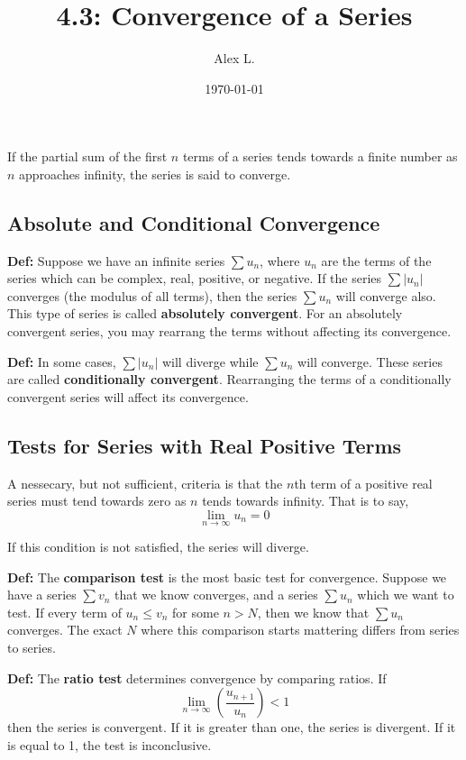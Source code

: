 \documentclass{article}
\title{4.3: Convergence of a Series}
\author{Alex L.}
\date{\today}
\begin{document}
\maketitle

If the partial sum of the first $n$ terms of a series tends towards a finite number as $n$ approaches infinity, the series is said to converge.

\subsection{Absolute and Conditional Convergence}

\textbf{Def:} Suppose we have an infinite series $\sum u_n$, where $u_n$ are the terms of the series which can be complex, real, positive, or negative. If the series $\sum \vert u_n \vert$ converges (the modulus of all terms), then the series $\sum u_n$ will converge also. This type of series is called \textbf{absolutely convergent}. For an absolutely convergent series, you may rearrang the terms without affecting its convergence. 

\textbf{Def:} In some cases, $\sum \vert u_n \vert$ will diverge while $\sum u_n$ will converge. These series are called \textbf{conditionally convergent}. Rearranging the terms of a conditionally convergent series will affect its convergence.

\subsection{Tests for Series with Real Positive Terms}

A nessecary, but not sufficient, criteria is that the $n$th term of a positive real series must tend towards zero as $n$ tends towards infinity. That is to say, $$\lim_{n \to \infty} u_n = 0$$

If this condition is not satisfied, the series will diverge.

\textbf{Def:} The \textbf{comparison test} is the most basic test for convergence. Suppose we have a series $\sum v_n$ that we know converges, and a series $\sum u_n$ which we want to test. If every term of $u_n \leq v_n$ for some $n>N$, then we know that $\sum u_n$ converges. The exact $N$ where this comparison starts mattering differs from series to series. 

\textbf{Def:} The \textbf{ratio test} determines convergence by comparing ratios. If $$\lim_{n \to \infty}(\frac{u_{n+1}}{u_n}) < 1$$then the series is convergent. If it is greater than one, the series is divergent. If it is equal to 1, the test is inconclusive.  
\end{document}
